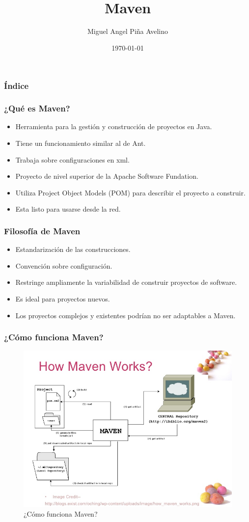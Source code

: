 \documentclass{beamer}
\title[Laboratorio]{Maven}
\author[Miguel]{Miguel Angel Piña Avelino}
\institute[UNAM]{
  Facultad de Ciencias, UNAM
}
\date{\today}
\begin{document}
\frame{\titlepage}

\begin{frame}
  \frametitle{Índice}
  \tableofcontents
\end{frame}

\begin{frame}
  \frametitle{¿Qué es Maven?}
  \begin{itemize}[<+->]
  \item Herramienta para la gestión y construcción de proyectos en Java.
  \item Tiene un funcionamiento similar al de Ant.
  \item Trabaja sobre configuraciones en xml.
  \item Proyecto de nivel superior de la Apache Software Fundation.
  \item Utiliza Project Object Models (POM) para describir el proyecto a construir.
  \item Esta listo para usarse desde la red.
  \end{itemize}
\end{frame}

\begin{frame}
  \frametitle{Filosofía de Maven}
  \begin{itemize}[<+->]
  \item Estandarización de las construcciones.
  \item Convención sobre configuración.
  \item Restringe ampliamente la variabilidad de construir proyectos de software.
  \item Es ideal para proyectos nuevos.
  \item Los proyectos complejos y existentes podrían no ser adaptables a Maven.
  \end{itemize}
\end{frame}

\begin{frame}[fragile]
  \frametitle{¿Cómo funciona Maven?}
  \begin{figure}[ht]
    \centering
    \includegraphics[scale=0.4]{figures/how-maven-works.jpg}
    \caption{\label{fig:maven} ¿Cómo funciona Maven?}
  \end{figure}

\end{frame}
\end{document}
